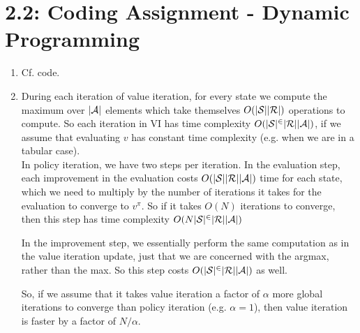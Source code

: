 \documentclass{article}
\begin{document}
\section*{2.2: Coding Assignment - Dynamic Programming}
\begin{enumerate}[label*=\arabic*.]
\item
Cf. code.

\item

During each iteration of value iteration, for every state we compute the maximum over $|\cal A|$ elements which take themselves $O(|\cal S||\cal R|)$ operations to compute. So each iteration in VI has time complexity $O(|\cal S|^2|\cal R||\cal A|)$, if we assume that evaluating $v$ has constant time complexity (e.g. when we are in a tabular case). \\[4mm]

In policy iteration, we have two steps per iteration.
In the evaluation step, each improvement in the evaluation costs $O( |\cal S||\cal R||\cal A|)$ time for each state, which we need to multiply by the number of iterations it takes for the evaluation to converge to $v^\pi$. So if it takes $O(N)$ iterations to converge, then this step has time complexity $O(N|\cal S|^2|\cal R||\cal A|)$

In the improvement step, we essentially perform the same computation as in the value iteration update, just that we are concerned with the argmax, rather than the max. So this step costs $O(|\cal S|^2|\cal R||\cal A|)$ as well.

So, if we assume that it takes value iteration a factor of $\alpha$ more global iterations to converge than policy iteration (e.g. $\alpha = 1$), then value iteration is faster by a factor of $N/\alpha$.

\end{enumerate}
\end{document}
